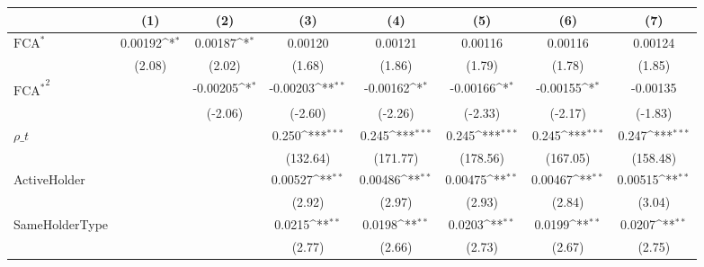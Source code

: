 {
\def\sym#1{\ifmmode^{#1}\else\(^{#1}\)\fi}
\begin{tabular}{l*{7}{c}}
\hline\hline
                    &\multicolumn{1}{c}{(1)}         &\multicolumn{1}{c}{(2)}         &\multicolumn{1}{c}{(3)}         &\multicolumn{1}{c}{(4)}         &\multicolumn{1}{c}{(5)}         &\multicolumn{1}{c}{(6)}         &\multicolumn{1}{c}{(7)}         \\
\hline
$ \text{FCA}^* $    &     0.00192\sym{*}  &     0.00187\sym{*}  &     0.00120         &     0.00121         &     0.00116         &     0.00116         &     0.00124         \\
                    &      (2.08)         &      (2.02)         &      (1.68)         &      (1.86)         &      (1.79)         &      (1.78)         &      (1.85)         \\
[1em]
 $ { \text{FCA} ^ * } ^2 $&                     &    -0.00205\sym{*}  &    -0.00203\sym{**} &    -0.00162\sym{*}  &    -0.00166\sym{*}  &    -0.00155\sym{*}  &    -0.00135         \\
                    &                     &     (-2.06)         &     (-2.60)         &     (-2.26)         &     (-2.33)         &     (-2.17)         &     (-1.83)         \\
[1em]
$ \rho\_t $          &                     &                     &       0.250\sym{***}&       0.245\sym{***}&       0.245\sym{***}&       0.245\sym{***}&       0.247\sym{***}\\
                    &                     &                     &    (132.64)         &    (171.77)         &    (178.56)         &    (167.05)         &    (158.48)         \\
[1em]
ActiveHolder        &                     &                     &     0.00527\sym{**} &     0.00486\sym{**} &     0.00475\sym{**} &     0.00467\sym{**} &     0.00515\sym{**} \\
                    &                     &                     &      (2.92)         &      (2.97)         &      (2.93)         &      (2.84)         &      (3.04)         \\
[1em]
SameHolderType      &                     &                     &      0.0215\sym{**} &      0.0198\sym{**} &      0.0203\sym{**} &      0.0199\sym{**} &      0.0207\sym{**} \\
                    &                     &                     &      (2.77)         &      (2.66)         &      (2.73)         &      (2.67)         &      (2.75)         \\

\end{tabular}}
